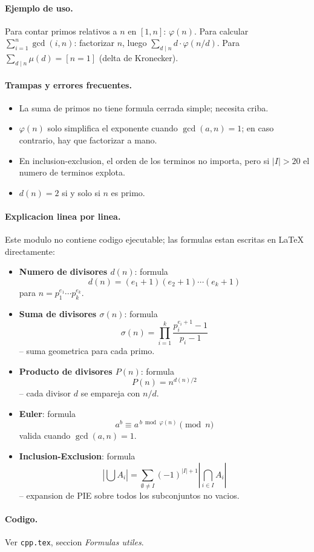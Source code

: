 \paragraph{Ejemplo de uso.}
Para contar primos relativos a $n$ en $[1, n]$: $\varphi(n)$. Para calcular $\sum_{i=1}^{n} \gcd(i, n)$: factorizar $n$, luego $\sum_{d \mid n} d \cdot \varphi(n/d)$. Para $\sum_{d \mid n} \mu(d) = [n=1]$ (delta de Kronecker).

\paragraph{Trampas y errores frecuentes.}
\begin{itemize}\setlength\itemsep{0pt}
	\item La suma de primos no tiene formula cerrada simple; necesita criba.
	\item $\varphi(n)$ solo simplifica el exponente cuando $\gcd(a, n) = 1$; en caso contrario, hay que factorizar a mano.
	\item En inclusion-exclusion, el orden de los terminos no importa, pero si $|I| > 20$ el numero de terminos explota.
	\item $d(n) = 2$ si y solo si $n$ es primo.
\end{itemize}

\paragraph{Explicacion linea por linea.}
Este modulo no contiene codigo ejecutable; las formulas estan escritas en LaTeX directamente:
\begin{itemize}\setlength\itemsep{0pt}
	\item \textbf{Numero de divisores $d(n)$}: formula $$d(n) = (e_1+1)(e_2+1)\cdots(e_k+1)$$ para $n = p_1^{e_1}\cdots p_k^{e_k}$.
	\item \textbf{Suma de divisores $\sigma(n)$}: formula $$\sigma(n) = \prod_{i=1}^{k} \frac{p_i^{e_i+1}-1}{p_i-1}$$ -- suma geometrica para cada primo.
	\item \textbf{Producto de divisores $P(n)$}: formula $$P(n) = n^{d(n)/2}$$ -- cada divisor $d$ se empareja con $n/d$.
	\item \textbf{Euler}: formula $$a^b \equiv a^{\,b \bmod \varphi(n)} \pmod{n}$$ valida cuando $\gcd(a,n)=1$.
	\item \textbf{Inclusion-Exclusion}: formula $$\left|\bigcup A_i\right| = \sum_{\emptyset \ne I} (-1)^{|I|+1} \left|\bigcap_{i \in I} A_i\right|$$ -- expansion de PIE sobre todos los subconjuntos no vacios.
\end{itemize}

\paragraph{Codigo.}
Ver \texttt{cpp.tex}, seccion \textit{Formulas utiles}.

\vspace{0.5em}
